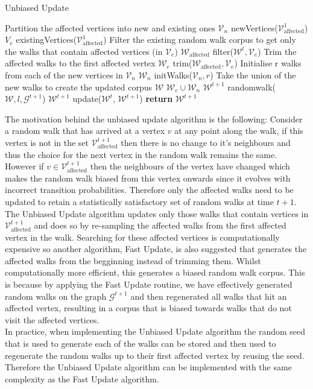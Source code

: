 \documentclass[a4paper]{article}
\renewcommand{\G}{\mathcal G}
\renewcommand{\V}{\mathcal V}
\newcommand{\W}{\mathcal W}
\begin{document}
\begin{algorithm}[!ht]
  \caption{Unbiased Update}
  \begin{algorithmic}[1]

    \Procedure{UnbiasedUpdate}{$\G^{t+1}, \W^t, \V^1_{\text{affected}}, r, l$}
    \LineComment Partition the affected vertices into new and existing ones
    \State $\V_n$ \leftarrow newVertices($\V_{\text{affected}}^1$)
    \State $V_e$ \leftarrow existingVertices($\V_{\text{affected}}^1$)
    \LineComment Filter the existing random walk corpus to get only the walks
    that contain affected vertices (in $\V_e$)
    \State $\W_{\text{affected}}$ \leftarrow filter($\W^t, \V_e$)
    \LineComment Trim the affected walks to the first affected vertex
    \State $\W_e$ \leftarrow trim($\W_{\text{affected}}, \V_e$)
    \LineComment \leftarrow Initialise r walks from each of the new vertices in $\V_n$
    \State $\W_n$ \leftarrow initWalks($\V_n, r$)
    \LineComment Take the union of the new walks to create the updated corpus
    \State $\W$ \leftarrow $\W_e \cup \W_n$
    \State $\W^{t+1}$ \leftarrow randomwalk($\W, l, \G^{t+1}$)
    \State $\W^{t+1}$ \leftarrow update($\W^t$, $\W^{t+1}$)
    \State \textbf{return} $\W^{t+1}$
    \EndProcedure
  \end{algorithmic}
\end{algorithm}
The motivation behind the unbiased update algorithm is the following: Consider a
random walk that has arrived at a vertex $v$ at any point along the walk, if
this vertex is not in the set $\V^{t+1}_{\text{affected}}$ then there is no
change to it's neighbours and thus the choice for the next vertex in the random
walk remains the same. However if $v \in \V^{t+1}_{\text{affected}}$ then the
neighbours of the vertex have changed which makes the random walk biased from
this vertex onwards since it evolves with incorrect transition probabilities. Therefore only the affected walks need to be updated to retain a statistically
satisfactory set of random walks at time $t+1$.\\
The Unbiased Update algorithm updates only those walks that contain vertices in
$\V^{t+1}_{\text{affected}}$ and does so by re-sampling the affected walks from
the first affected vertex in the walk. Searching for these affected vertices is computationally expensive so another algorithm,
Fast Update, is also suggested that generates the affected walks from the
begginning instead of trimming them. Whilst computationally more efficient, this
generates a biased random walk corpus. This is because by applying the Fast Update routine, we have
effectively generated random walks on the graph $\G^{t+1}$ and then regenerated
all walks that hit an affected vertex, resulting in a corpus that is biased towards walks
that do not visit the affected vertices.\\
In practice, when implementing the Unbiased Update algorithm the random seed
that is used to generate each of the walks can be stored and then used to
regenerate the random walks up to their first affected vertex by reusing the
seed. Therefore the Unbiased Update algorithm can be implemented with the same
complexity as the Fast Update algorithm.\\
\end{document}
